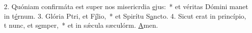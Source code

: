 2. Quóniam confirmáta est super nos misericrdia \uline{e}jus:~* et véritas Dómini manet in t\uline{é}rnum.
3. Glória Ptri, et F\uline{í}lio,~* et Spirítu S\uline{a}ncto.
4. Sicut erat in princípio, t nunc, et s\uline{e}mper,~* et in sǽcula sæculórm. \uline{A}men.
